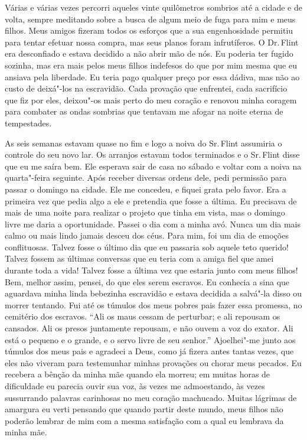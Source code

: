 Várias e várias vezes percorri aqueles
vinte quilômetros sombrios até a cidade e de volta, sempre meditando
sobre a busca de algum meio de fuga para mim e meus filhos. Meus amigos
fizeram todos os esforços que a sua engenhosidade permitiu para tentar
efetuar nossa compra, mas seus planos foram infrutíferos. O Dr.\,Flint
era desconfiado e estava decidido a não abrir mão de nós. Eu poderia ter
fugido sozinha, mas era mais pelos meus filhos indefesos do que por mim
mesma que eu ansiava pela liberdade. Eu teria pago qualquer preço por
essa dádiva, mas não ao custo de deixá"-los na escravidão. Cada provação
que enfrentei, cada sacrifício que fiz por eles, deixou"-os mais perto do
meu coração e renovou minha coragem para combater as ondas sombrias que
tentavam me afogar na noite eterna de tempestades.

As seis semanas estavam quase no fim e
logo a noiva do Sr.\,Flint assumiria o controle do seu novo lar. Os
arranjos estavam todos terminados e o Sr.\,Flint disse que eu me saíra
bem. Ele esperava sair de casa no sábado e voltar com a noiva na
quarta"-feira seguinte. Após receber diversas ordens dele, pedi permissão
para passar o domingo na cidade. Ele me concedeu, e fiquei grata pelo
favor. Era a primeira vez que pedia algo a ele e pretendia que fosse a
última. Eu precisava de mais de uma noite para realizar o projeto que
tinha em vista, mas o domingo livre me daria a oportunidade. Passei o
dia com a minha avó. Nunca um dia mais calmo ou mais lindo jamais desceu
dos céus. Para mim, foi um dia de emoções conflituosas. Talvez fosse o
último dia que eu passaria sob aquele teto querido! Talvez fossem as
últimas conversas que eu teria com a amiga fiel que amei durante toda a
vida! Talvez fosse a última vez que estaria junto com meus filhos! Bem,
melhor assim, pensei, do que eles serem escravos. Eu conhecia a sina que
aguardava minha linda bebezinha escravidão e estava decidida a salvá"-la
disso ou morrer tentando. Fui até os túmulos dos meus pobres pais fazer
essa promessa, no cemitério dos escravos. ``Ali os maus cessam de
perturbar; e ali repousam os cansados. Ali os presos juntamente
repousam, e não ouvem a voz do exator. Ali está o pequeno e o grande, e
o servo livre de seu senhor.'' Ajoelhei"-me junto aos túmulos dos meus
pais e agradeci a Deus, como já fizera antes tantas vezes, que eles não
viveram para testemunhar minhas provações ou chorar meus pecados. Eu
recebera a bênção da minha mãe quando ela morreu; em muitas horas de
dificuldade eu parecia ouvir sua voz, às vezes me admoestando, às vezes
sussurrando palavras carinhosas no meu coração machucado. Muitas
lágrimas de amargura eu verti pensando que quando partir deste mundo,
meus filhos não poderão lembrar de mim com a mesma satisfação com a qual
eu lembrava da minha mãe.


